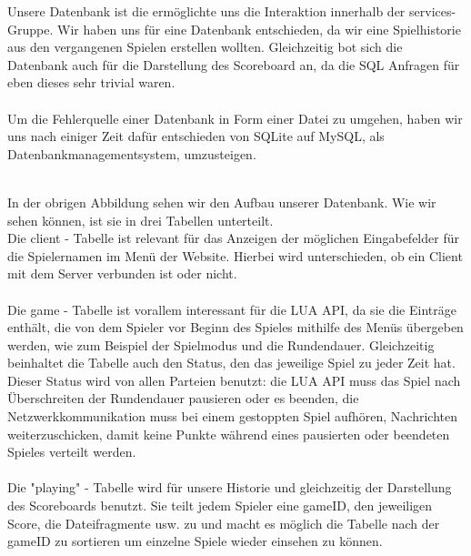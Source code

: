 Unsere Datenbank ist die ermöglichte uns die Interaktion innerhalb der services-Gruppe. Wir haben uns für eine Datenbank entschieden, da wir eine Spielhistorie aus den vergangenen Spielen erstellen wollten. Gleichzeitig bot sich die Datenbank auch für die Darstellung des Scoreboard an, da die SQL Anfragen für eben dieses sehr trivial waren.\\\\
Um die Fehlerquelle einer Datenbank in Form einer Datei zu umgehen, haben wir uns nach einiger Zeit dafür entschieden von SQLite auf MySQL, als Datenbankmanagementsystem, umzusteigen.\\\\
\begin{center}
\end{center}

In der obrigen Abbildung sehen wir den Aufbau unserer Datenbank. Wie wir sehen können, ist sie in drei Tabellen unterteilt.\\
Die client - Tabelle ist relevant für das Anzeigen der möglichen Eingabefelder für die Spielernamen im Menü der Website. Hierbei wird unterschieden, ob ein Client mit dem Server verbunden ist oder nicht.\\\\
Die game - Tabelle ist vorallem interessant für die LUA API, da sie die Einträge enthält, die von dem Spieler vor Beginn des Spieles mithilfe des Menüs übergeben werden, wie zum Beispiel der Spielmodus und die Rundendauer. Gleichzeitig beinhaltet die Tabelle auch den Status, den das jeweilige Spiel zu jeder Zeit hat. Dieser Status wird von allen Parteien benutzt: die LUA API muss das Spiel nach Überschreiten der Rundendauer pausieren oder es beenden, die Netzwerkkommunikation muss bei einem gestoppten Spiel aufhören, Nachrichten weiterzuschicken, damit keine Punkte während eines pausierten oder beendeten Spieles verteilt werden.\\\\
Die "playing" - Tabelle wird für unsere Historie und gleichzeitig der Darstellung des Scoreboards benutzt. Sie teilt jedem Spieler eine gameID, den jeweiligen Score, die Dateifragmente usw. zu und macht es möglich die Tabelle nach der gameID zu sortieren um einzelne Spiele wieder einsehen zu können.

